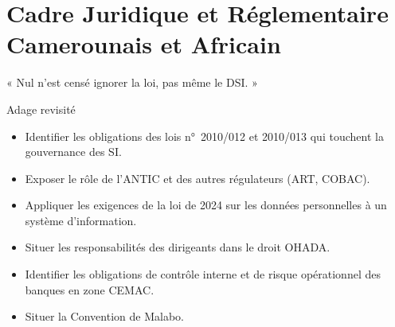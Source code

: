 
\chapter{Cadre Juridique et Réglementaire Camerounais et Africain}
\label{chap:droit}

\epigraph{%
    « Nul n'est censé ignorer la loi, pas même le DSI. »%
}{Adage revisité}


\begin{boxobjectifs}
\begin{itemize}
    \item Identifier les obligations des lois n°~2010/012 et 2010/013 qui
          touchent la gouvernance des SI.
    \item Exposer le rôle de l'ANTIC et des autres régulateurs (ART,
          COBAC).
    \item Appliquer les exigences de la loi de 2024 sur les données
          personnelles à un système d'information.
    \item Situer les responsabilités des dirigeants dans le droit OHADA.
    \item Identifier les obligations de contrôle interne et de risque
          opérationnel des banques en zone CEMAC.
    \item Situer la Convention de Malabo.
\end{itemize}
\end{boxobjectifs}

